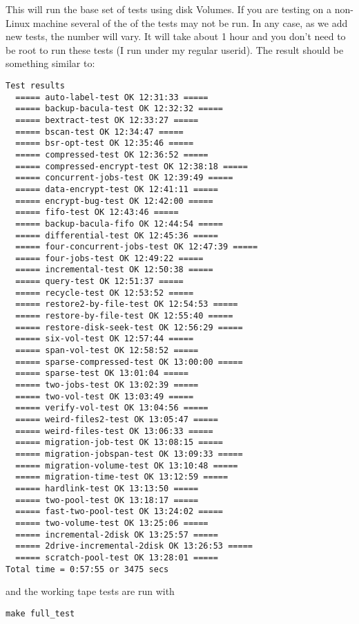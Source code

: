 This will run the base set of tests using disk Volumes.
If you are testing on a
non-Linux machine several of the of the tests may not be run.  In any case,
as we add new tests, the number will vary.  It will take about 1 hour
and you don't need to be root
to run these tests (I run under my regular userid).  The result should be
something similar to:

\footnotesize
\begin{verbatim}
Test results
  ===== auto-label-test OK 12:31:33 =====
  ===== backup-bacula-test OK 12:32:32 =====
  ===== bextract-test OK 12:33:27 =====
  ===== bscan-test OK 12:34:47 =====
  ===== bsr-opt-test OK 12:35:46 =====
  ===== compressed-test OK 12:36:52 =====
  ===== compressed-encrypt-test OK 12:38:18 =====
  ===== concurrent-jobs-test OK 12:39:49 =====
  ===== data-encrypt-test OK 12:41:11 =====
  ===== encrypt-bug-test OK 12:42:00 =====
  ===== fifo-test OK 12:43:46 =====
  ===== backup-bacula-fifo OK 12:44:54 =====
  ===== differential-test OK 12:45:36 =====
  ===== four-concurrent-jobs-test OK 12:47:39 =====
  ===== four-jobs-test OK 12:49:22 =====
  ===== incremental-test OK 12:50:38 =====
  ===== query-test OK 12:51:37 =====
  ===== recycle-test OK 12:53:52 =====
  ===== restore2-by-file-test OK 12:54:53 =====
  ===== restore-by-file-test OK 12:55:40 =====
  ===== restore-disk-seek-test OK 12:56:29 =====
  ===== six-vol-test OK 12:57:44 =====
  ===== span-vol-test OK 12:58:52 =====
  ===== sparse-compressed-test OK 13:00:00 =====
  ===== sparse-test OK 13:01:04 =====
  ===== two-jobs-test OK 13:02:39 =====
  ===== two-vol-test OK 13:03:49 =====
  ===== verify-vol-test OK 13:04:56 =====
  ===== weird-files2-test OK 13:05:47 =====
  ===== weird-files-test OK 13:06:33 =====
  ===== migration-job-test OK 13:08:15 =====
  ===== migration-jobspan-test OK 13:09:33 =====
  ===== migration-volume-test OK 13:10:48 =====
  ===== migration-time-test OK 13:12:59 =====
  ===== hardlink-test OK 13:13:50 =====
  ===== two-pool-test OK 13:18:17 =====
  ===== fast-two-pool-test OK 13:24:02 =====
  ===== two-volume-test OK 13:25:06 =====
  ===== incremental-2disk OK 13:25:57 =====
  ===== 2drive-incremental-2disk OK 13:26:53 =====
  ===== scratch-pool-test OK 13:28:01 =====
Total time = 0:57:55 or 3475 secs

\end{verbatim}
\normalsize

and the working tape tests are run with

\footnotesize
\begin{verbatim}
make full_test
\end{verbatim}
\normalsize


